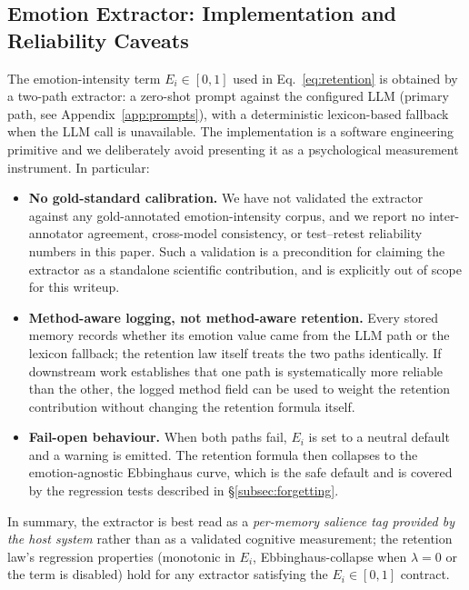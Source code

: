 \subsection{Emotion Extractor: Implementation and Reliability Caveats}
\label{subsec:emotion_extractor}

The emotion-intensity term $E_i \in [0, 1]$ used in Eq.~\ref{eq:retention} is obtained by a two-path extractor: a zero-shot prompt against the configured LLM (primary path, see Appendix~\ref{app:prompts}), with a deterministic lexicon-based fallback when the LLM call is unavailable. The implementation is a software engineering primitive and we deliberately avoid presenting it as a psychological measurement instrument. In particular:
\begin{itemize}
    \item \textbf{No gold-standard calibration.} We have not validated the extractor against any gold-annotated emotion-intensity corpus, and we report no inter-annotator agreement, cross-model consistency, or test--retest reliability numbers in this paper. Such a validation is a precondition for claiming the extractor as a standalone scientific contribution, and is explicitly out of scope for this writeup.
    \item \textbf{Method-aware logging, not method-aware retention.} Every stored memory records whether its emotion value came from the LLM path or the lexicon fallback; the retention law itself treats the two paths identically. If downstream work establishes that one path is systematically more reliable than the other, the logged method field can be used to weight the retention contribution without changing the retention formula itself.
    \item \textbf{Fail-open behaviour.} When both paths fail, $E_i$ is set to a neutral default and a warning is emitted. The retention formula then collapses to the emotion-agnostic Ebbinghaus curve, which is the safe default and is covered by the regression tests described in \S\ref{subsec:forgetting}.
\end{itemize}
In summary, the extractor is best read as a \emph{per-memory salience tag provided by the host system} rather than as a validated cognitive measurement; the retention law's regression properties (monotonic in $E_i$, Ebbinghaus-collapse when $\lambda = 0$ or the term is disabled) hold for any extractor satisfying the $E_i \in [0, 1]$ contract.
